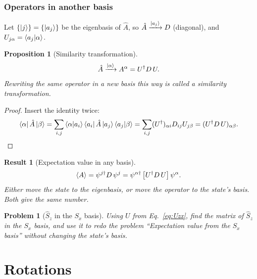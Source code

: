 \documentclass{article}
\newtheorem{problem}{Problem}
\newtheorem{proposition}{Proposition}
\newtheorem{result}{Result}
\begin{document}
\subsubsection{Operators in another basis}
Let $\{\ket{j}\} = \{\ket{a_j}\}$ be the eigenbasis of $\hat{A}$, so $\hat{A} \xrightarrow{\ket{a_j}} D$ (diagonal), and $U_{j\alpha} = \braket{a_j|\alpha}$.
\begin{proposition}[Similarity transformation]
    \begin{equation}
        \hat{A} \xrightarrow{\ket{\alpha}} A^{\alpha} = U^\dagger D\,U.
    \end{equation}
    Rewriting the same operator in a new basis this way is called a similarity transformation.
\end{proposition}
\begin{proof}
    Insert the identity twice:
    \[\bra{\alpha}\hat{A}\ket{\beta} = \sum_{i,j}\braket{\alpha|a_i}\bra{a_i}\hat{A}\ket{a_j}\braket{a_j|\beta} = \sum_{i,j}(U^\dagger)_{\alpha i}D_{ij}U_{j\beta} = (U^\dagger D\,U)_{\alpha\beta}.\]
\end{proof}
\begin{result}[Expectation value in any basis]
    \begin{equation}
        \braket{A} = \psi^{j\dagger}D\,\psi^{j} = \psi^{\alpha\dagger}\left[U^\dagger D\,U\right]\psi^{\alpha}.
    \end{equation}
    Either move the state to the eigenbasis, or move the operator to the state's basis. Both give the same number.
\end{result}
\begin{problem}[$\hat{S}_z$ in the $S_x$ basis]
    Using $U$ from Eq.~\eqref{eq:Uzx}, find the matrix of $\hat{S}_z$ in the $S_x$ basis, and use it to redo the problem ``Expectation value from the $S_x$ basis'' without changing the state's basis.
\end{problem}


\section{Rotations}
\end{document}
